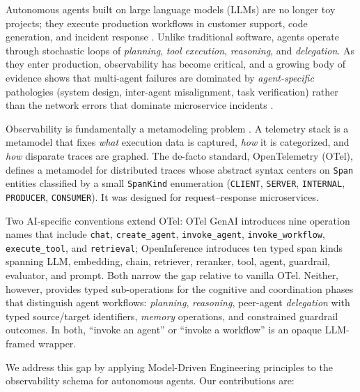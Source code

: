 \documentclass[sigconf,nonacm]{acmart}
\begin{document}
Autonomous agents built on large language models (LLMs) are no longer toy projects; they execute production workflows in customer support, code generation, and incident response \cite{wu2023autogen,langchain2023,crewai2023}. Unlike traditional software, agents operate through stochastic loops of \emph{planning}, \emph{tool execution}, \emph{reasoning}, and \emph{delegation}. As they enter production, observability has become critical, and a growing body of evidence shows that multi-agent failures are dominated by \emph{agent-specific} pathologies (system design, inter-agent misalignment, task verification) rather than the network errors that dominate microservice incidents \cite{cemri2025multiagent}.

Observability is fundamentally a metamodeling problem \cite{atkinson2003mdd,bezivin2005unification,brambilla2017mde}. A telemetry stack is a metamodel that fixes \emph{what} execution data is captured, \emph{how} it is categorized, and \emph{how} disparate traces are graphed. The de-facto standard, OpenTelemetry (OTel), defines a metamodel for distributed traces whose abstract syntax centers on \texttt{Span} entities classified by a small \texttt{SpanKind} enumeration (\texttt{CLIENT}, \texttt{SERVER}, \texttt{INTERNAL}, \texttt{PRODUCER}, \texttt{CONSUMER}). It was designed for request--response microservices.

Two AI-specific conventions extend OTel: OTel GenAI \cite{opentelemetry-genai} introduces nine operation names that include \texttt{chat}, \texttt{create\_agent}, \texttt{invoke\_agent}, \texttt{invoke\_workflow}, \texttt{execute\_tool}, and \texttt{retrieval}; OpenInference \cite{openinference2024} introduces ten typed span kinds spanning LLM, embedding, chain, retriever, reranker, tool, agent, guardrail, evaluator, and prompt. Both narrow the gap relative to vanilla OTel. Neither, however, provides typed sub-operations for the cognitive and coordination phases that distinguish agent workflows: \emph{planning}, \emph{reasoning}, peer-agent \emph{delegation} with typed source/target identifiers, \emph{memory} operations, and constrained guardrail outcomes. In both, ``invoke an agent'' or ``invoke a workflow'' is an opaque LLM-framed wrapper.

We address this gap by applying Model-Driven Engineering principles to the observability schema for autonomous agents. Our contributions are:
\end{document}
